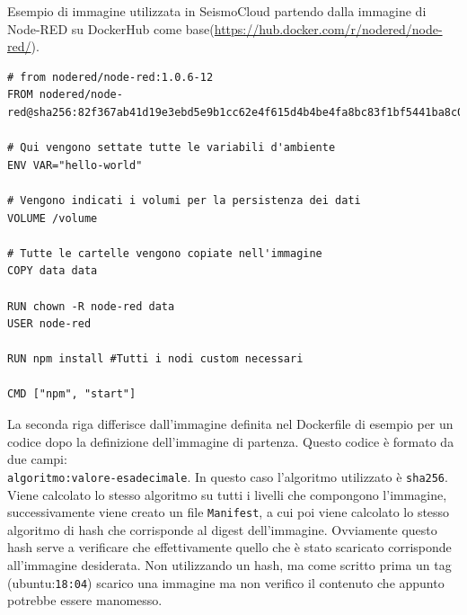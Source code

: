 \documentclass[a4paper,10pt]{memoir}
\begin{document}
\vspace{0.02\textwidth}
\begin{center}
Esempio di immagine utilizzata in SeismoCloud partendo dalla immagine di Node-RED su DockerHub come base(\href{https://hub.docker.com/r/nodered/node-red/}{https://hub.docker.com/r/nodered/node-red/}).
\end{center}

\begin{lstlisting}[language=docker]
# from nodered/node-red:1.0.6-12
FROM nodered/node-red@sha256:82f367ab41d19e3ebd5e9b1cc62e4f615d4b4be4fa8bc83f1bf5441ba8c0d32a

# Qui vengono settate tutte le variabili d'ambiente
ENV VAR="hello-world"

# Vengono indicati i volumi per la persistenza dei dati
VOLUME /volume

# Tutte le cartelle vengono copiate nell'immagine
COPY data data

RUN chown -R node-red data
USER node-red

RUN npm install #Tutti i nodi custom necessari

CMD ["npm", "start"]
\end{lstlisting}
La seconda riga differisce dall'immagine definita nel Dockerfile di esempio per un codice dopo la definizione dell'immagine di partenza.
Questo codice è formato da due campi:\\ \texttt{algoritmo:valore-esadecimale}.
In questo caso l'algoritmo utilizzato è \texttt{sha256}. Viene calcolato lo stesso algoritmo su tutti i livelli che compongono l'immagine, successivamente viene creato un file \texttt{Manifest}, a cui poi viene calcolato lo stesso algoritmo di hash che corrisponde al digest dell'immagine. Ovviamente questo hash serve a verificare che effettivamente quello che è stato scaricato corrisponde all'immagine desiderata. Non utilizzando un hash, ma come scritto prima un tag (ubuntu:\texttt{18:04}) scarico una immagine ma non verifico il contenuto che appunto potrebbe essere manomesso. 
\end{document}
